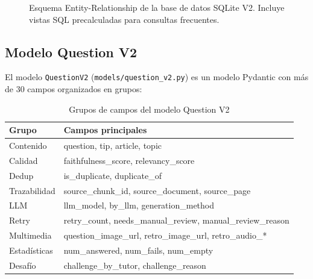 \documentclass[10pt,twocolumn,letterpaper]{article}
\begin{document}
\begin{figure}[H]
\caption{Esquema Entity-Relationship de la base de datos SQLite V2.
Incluye vistas SQL precalculadas para consultas frecuentes.}
\label{fig:database}
\end{figure}

\subsection{Modelo Question V2}

El modelo \texttt{QuestionV2} (\texttt{models/question\_v2.py}) es un modelo Pydantic
con m\'as de 30 campos organizados en grupos:

\begin{table}[H]
\centering
\caption{Grupos de campos del modelo Question V2}
\label{tab:questionv2}
\scriptsize
\begin{tabularx}{\columnwidth}{lX}
\toprule
\textbf{Grupo} & \textbf{Campos principales} \\
\midrule
Contenido & question, tip, article, topic \\
Calidad & faithfulness\_score, relevancy\_score \\
Dedup & is\_duplicate, duplicate\_of \\
Trazabilidad & source\_chunk\_id, source\_document, source\_page \\
LLM & llm\_model, by\_llm, generation\_method \\
Retry & retry\_count, needs\_manual\_review, manual\_review\_reason \\
Multimedia & question\_image\_url, retro\_image\_url, retro\_audio\_* \\
Estad\'isticas & num\_answered, num\_fails, num\_empty \\
Desaf\'io & challenge\_by\_tutor, challenge\_reason \\
\bottomrule
\end{tabularx}
\end{table}
\end{document}
